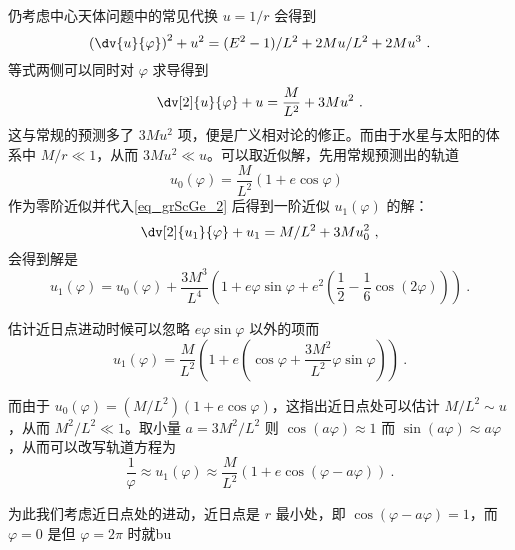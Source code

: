 仍考虑中心天体问题中的常见代换 $u = 1/r$ 会得到
\begin{equation}
\left( \dv{u}{\varphi} \right)^2 + u^2 = (E^2-1)/L^2 + 2Mu/L^2 + 2Mu^3 ~.
\end{equation}
等式两侧可以同时对 $\varphi$ 求导得到
\begin{equation}\label{eq_grScGe_2}
\dv[2]{u}{\varphi} + u = \frac{M}{L^2} + 3M u^2 ~.
\end{equation}
这与常规的预测多了 $3Mu^2$ 项，便是广义相对论的修正。而由于水星与太阳的体系中 $M/r \ll 1$，从而 $3Mu^2 \ll u$。可以取近似解，先用常规预测出的轨道
\begin{equation}
u_0(\varphi) = \frac{M}{L^2}(1 + e \cos \varphi) ~~
\end{equation}
作为零阶近似并代入\autoref{eq_grScGe_2} 后得到一阶近似 $u_1(\varphi)$ 的解：
\begin{equation}
\dv[2]{u_1}{\varphi} + u_1 = M/L^2 + 3M u_0^2 ~,
\end{equation}
会得到解是
\begin{equation}
u_1(\varphi) = u_0(\varphi) + \frac{3M^3}{L^4} \left( 1 + e\varphi \sin \varphi + e^2\left( \frac12 - \frac16 \cos(2\varphi) \right) \right) ~.
\end{equation}

估计近日点进动时候可以忽略 $e\varphi \sin \varphi$ 以外的项而
\begin{equation}
u_1(\varphi) = \frac{M}{L^2} \left( 1 + e\left(\cos \varphi + \frac{3M^2}{L^2} \varphi \sin \varphi \right) \right) ~.
\end{equation}

而由于 $u_0(\varphi) = (M/L^2) (1+e\cos \varphi)$，这指出近日点处可以估计 $M/L^2 \sim u$，从而 $M^2/L^2 \ll 1$。取小量 $a = 3M^2/L^2$ 则 $\cos(a\varphi) \approx 1$ 而 $\sin(a \varphi) \approx a\varphi$，从而可以改写轨道方程为
\begin{equation}
\frac{1}{\varphi} \approx u_1(\varphi) \approx \frac{M}{L^2} (1 + e \cos (\varphi - a \varphi)) ~.
\end{equation}

为此我们考虑近日点处的进动，近日点是 $r$ 最小处，即 $\cos(\varphi - a\varphi) = 1$，而 $\varphi=0$ 是但 $\varphi=2\pi$ 时就bu